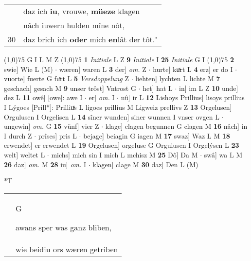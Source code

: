 \documentclass[8pt,a4paper,notitlepage]{article}
\begin{document}
\begin{table}[ht]
\begin{minipage}[t]{0.5\linewidth}
\begin{tabular}{rl}
 & daz ich \textbf{iu}, vrouwe, \textbf{müeze} klagen\\ 
 & nâch iuwern hulden mîne nôt,\\ 
30 & daz brich ich \textbf{oder} mich \textbf{en}lât der tôt."\\ 
\end{tabular}
\scriptsize
\line(1,0){75} \newline
G I L M Z \newline
\line(1,0){75} \newline
\textbf{1} \textit{Initiale} L Z  \textbf{9} \textit{Initiale} I  \textbf{25} \textit{Initiale} G I  \newline
\line(1,0){75} \newline
\textbf{2} swie] Wie L (M)  $\cdot$ wæren] waren L \textbf{3} der] \textit{om.} Z  $\cdot$ hurte] kuͯrt L \textbf{4} erz] er do I  $\cdot$ vuorte] fuerte G fuͯrt L \textbf{5} \textit{Versdoppelung} Z   $\cdot$ liehten] lychten L lichte M \textbf{7} geschach] gesach M \textbf{9} unser trôst] Vntrost G  $\cdot$ het] hat L  $\cdot$ in] im L Z \textbf{10} unde] dez L \textbf{11} owê] [owe]: awe I  $\cdot$ er] \textit{om.} I  $\cdot$ nû] ir L \textbf{12} Lishoys Prillius] lisoys prillius I Lýgoes [Prill*]: Prilliuͯs L ligoes prillius M Ligweiz prellivs Z \textbf{13} Orgelusen] Orgulusen I Orgelisen L \textbf{14} sîner wunden] siner wunnen I vnser ovgen L  $\cdot$ ungewin] \textit{om.} G \textbf{15} vünf] vier Z  $\cdot$ klage] clagen begunnen G clagen M \textbf{16} nâch] in I durch Z  $\cdot$ prîses] pris L  $\cdot$ bejage] beiagin G iagen M \textbf{17} swaz] Waz L M \textbf{18} erwendet] er erwendet L \textbf{19} Orgelusen] orgeluse G Orgulusen I Orgelýsen L \textbf{23} welt] weltet L  $\cdot$ michs] mich sin I mich L mchisz M \textbf{25} Dô] Da M  $\cdot$ swâ] wa L M \textbf{26} daz] \textit{om.} M \textbf{28} iu] \textit{om.} I  $\cdot$ klagen] clage M \textbf{30} daz] Den L (M) \newline
\end{minipage}
\hspace{0.5cm}
\begin{minipage}[t]{0.5\linewidth}
\small
\begin{center}*T
\end{center}
\begin{tabular}{rl}
 & \begin{large}G\end{large}awans sper was ganz bliben,\\ 
 & wie beidiu ors wæren getriben\\ 

\end{tabular}
\end{minipage}
\end{table}
\end{document}
